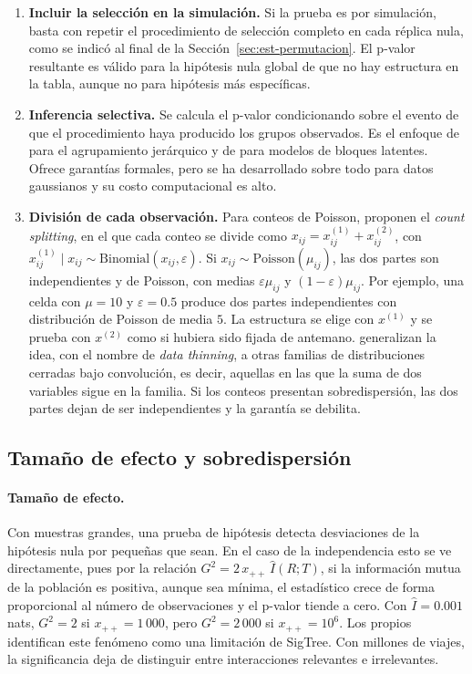 \begin{enumerate}
  \item \textbf{Incluir la selección en la simulación.} Si la prueba es por
  simulación, basta con repetir el procedimiento de selección completo en cada
  réplica nula, como se indicó al final de la Sección~\ref{sec:est-permutacion}.
  El p-valor resultante es válido para la hipótesis nula global de que no hay
  estructura en la tabla, aunque no para hipótesis más específicas.
  \item \textbf{Inferencia selectiva.} Se calcula el p-valor condicionando sobre
  el evento de que el procedimiento haya producido los grupos observados. Es el
  enfoque de \cite{Gao2024} para el agrupamiento jerárquico y de
  \cite{Watanabe2021si} para modelos de bloques latentes. Ofrece garantías
  formales, pero se ha desarrollado sobre todo para datos gaussianos y su costo
  computacional es alto.
  \item \textbf{División de cada observación.} Para conteos de Poisson,
  \cite{Neufeld2024cs} proponen el \emph{count splitting}, en el que cada conteo se divide
  como $x_{ij} = x^{(1)}_{ij} + x^{(2)}_{ij}$, con $x^{(1)}_{ij} \mid x_{ij} \sim
  \mathrm{Binomial}(x_{ij}, \varepsilon)$. Si $x_{ij} \sim
  \mathrm{Poisson}(\mu_{ij})$, las dos partes son independientes y de Poisson, con
  medias $\varepsilon\mu_{ij}$ y $(1-\varepsilon)\mu_{ij}$. Por ejemplo, una celda con $\mu = 10$ y $\varepsilon = 0.5$ produce dos partes independientes con distribución de Poisson de media $5$. La estructura se
  elige con $x^{(1)}$ y se prueba con $x^{(2)}$ como si hubiera sido fijada de
  antemano. \cite{Neufeld2024dt} generalizan la idea, con el nombre de
  \emph{data thinning}, a otras familias de distribuciones cerradas bajo convolución, es decir, aquellas en las que la suma de dos variables sigue en la familia. Si los conteos presentan sobredispersión, las dos partes dejan de
  ser independientes y la garantía se debilita.
\end{enumerate}

\subsection{Tamaño de efecto y sobredispersión}\label{sec:est-efecto}

\paragraph{Tamaño de efecto.} Con muestras grandes, una prueba de hipótesis
detecta desviaciones de la hipótesis nula por pequeñas que sean. En el caso de la
independencia esto se ve directamente, pues por la relación $G^2 = 2\,x_{++}\,\hat
I(R;T)$, si la información mutua de la población es positiva, aunque sea
mínima, el estadístico crece de forma proporcional al número de observaciones y
el p-valor tiende a cero. Con $\hat I = 0.001$ nats, $G^2 = 2$ si $x_{++} = 1\,000$, pero $G^2 = 2\,000$ si $x_{++} = 10^6$. Los propios \cite[Sec.~5]{Hu2025} identifican este
fenómeno como una limitación de SigTree. Con millones de viajes, la
significancia deja de distinguir entre interacciones relevantes e irrelevantes.

